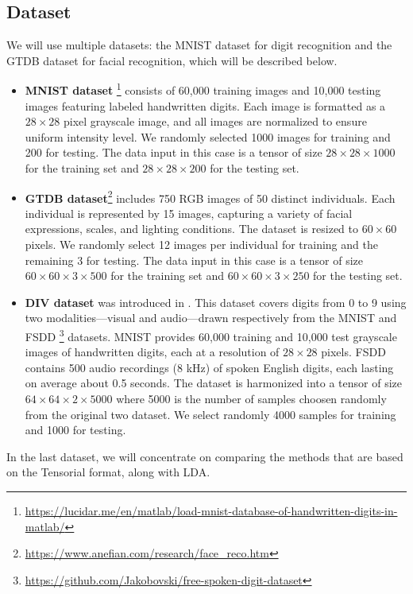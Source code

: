 \documentclass{siamltex}
\begin{document}
\subsection{Dataset}
We will use multiple datasets: the MNIST dataset for digit recognition and the GTDB dataset for facial recognition, which will be described below.
\begin{itemize}
\item \textbf{MNIST dataset} \footnote{\url{https://lucidar.me/en/matlab/load-mnist-database-of-handwritten-digits-in-matlab/}} consists of 60,000 training images and 10,000 testing images featuring labeled handwritten digits. Each image is formatted as a $28 \times 28$ pixel grayscale image, and all images are normalized to ensure uniform intensity level. We randomly selected 1000 images for training and 200 for testing. The data input in this case is a tensor of size $28 \times 28 \times 1000$ for the training set and $28 \times 28 \times 200$ for the testing set.
\item \textbf{GTDB dataset}\footnote{\url{https://www.anefian.com/research/face_reco.htm}} includes 750 RGB images of 50 distinct individuals. Each individual is represented by 15 images, capturing a variety of facial expressions, scales, and lighting conditions. The dataset is resized to $60 \times 60$ pixels. We randomly select 12 images per individual for training and the remaining 3 for testing. The data input in this case is a tensor of size $60 \times 60 \times 3 \times 500$ for the training set and $60 \times 60 \times 3 \times 250$ for the testing set.
\item \textbf{DIV dataset} was introduced in \cite{dufrenois2023multilinear}. This dataset covers digits from 0 to 9 using two modalities—visual and audio—drawn respectively from the MNIST and FSDD \footnote{\url{https://github.com/Jakobovski/free-spoken-digit-dataset}} datasets. MNIST provides 60,000 training and 10,000 test grayscale images of handwritten digits, each at a resolution of $28\times 28$ pixels. FSDD contains 500 audio recordings (8 kHz) of spoken English digits, each lasting on average about 0.5 seconds. The dataset is harmonized into a tensor of size $64 \times 64 \times 2 \times 5000$ where 5000 is the number of samples choosen randomly from the original two dataset. We select randomly 4000 samples for training and 1000 for testing.
\end{itemize}
In the last dataset, we will concentrate on comparing the methods that are based on the Tensorial format, along with LDA.
\end{document}
